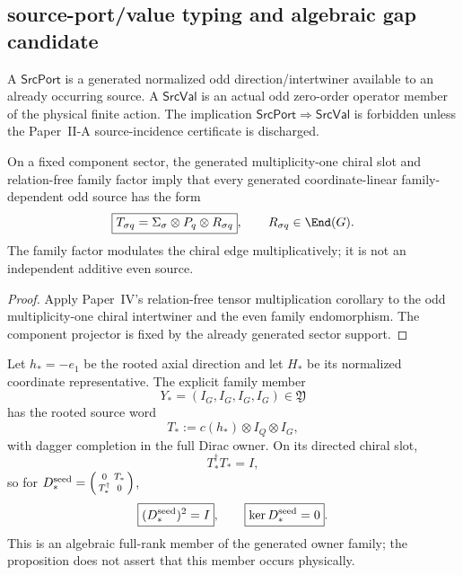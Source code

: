 \documentclass[12pt,a4paper]{article}
\begin{document}
\subsection{source-port/value typing and algebraic gap candidate}
\label{p5:sec:v389-source-port-value-factor}

\begin{definition}
\label{p5:def:v389-srcport-srcval}
A $\mathsf{SrcPort}$ is a generated normalized odd direction/intertwiner
available to an already occurring source.  A $\mathsf{SrcVal}$ is an actual
odd zero-order operator member of the physical finite action.  The implication
$\mathsf{SrcPort}\Rightarrow\mathsf{SrcVal}$ is forbidden unless the
Paper~II-A source-incidence certificate is discharged.
\end{definition}

\begin{theorem}
\label{p5:thm:v389-factorized-family-source}
On a fixed component sector, the generated multiplicity-one chiral slot and
relation-free family factor imply that every generated coordinate-linear
family-dependent odd source has the form
\[
 \boxed{T_{\sigma q}=\Sigma_\sigma\otimes P_q\otimes R_{\sigma q}},
 \qquad R_{\sigma q}\in\End(G).
\]
The family factor modulates the chiral edge multiplicatively; it is not an
independent additive even source.
\end{theorem}
\begin{proof}
Apply Paper~IV's relation-free tensor multiplication corollary to the odd
multiplicity-one chiral intertwiner and the even family endomorphism.  The
component projector is fixed by the already generated sector support.
\end{proof}

\begin{proposition}
\label{p5:prop:v389-primitive-rooted-owner-member}
Let $h_*=-e_1$ be the rooted axial direction and let $H_*$ be its normalized
coordinate representative.  The explicit family member
\[
 Y_*=(I_G,I_G,I_G,I_G)\in\mathfrak Y
\]
has the rooted source word
\[
 T_*:=c(h_*)\otimes I_Q\otimes I_G,
\]
with dagger completion in the full Dirac owner.  On its directed chiral slot,
\[
 \boxed{T_*^\dagger T_*=I},
\]
so for
$D_*^{\rm seed}=\left(\begin{smallmatrix}0&T_*\\T_*^\dagger&0\end{smallmatrix}\right)$,
\[
 \boxed{(D_*^{\rm seed})^2=I},\qquad \boxed{\ker D_*^{\rm seed}=0}.
\]
This is an algebraic full-rank member of the generated owner family; the
proposition does not assert that this member occurs physically.
\end{proposition}
\end{document}
